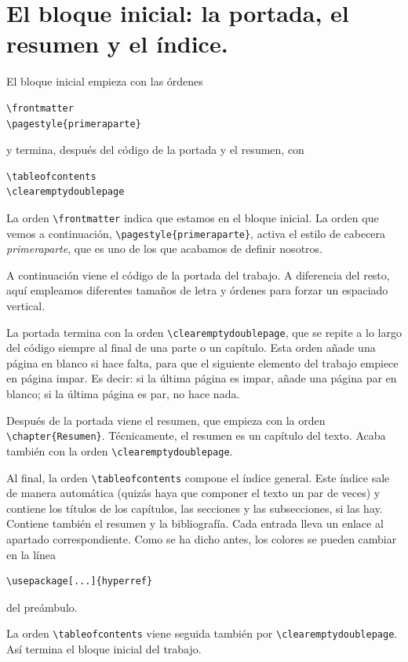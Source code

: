 \documentclass[11pt]{book}
\newcommand{\clearemptydoublepage}{\newpage{\pagestyle{empty}\cleardoublepage}}
\theoremstyle{plain} %
\theoremstyle{definition} %
\begin{document}
\section{El bloque inicial: la portada, el resumen y el índice.}

El bloque inicial empieza con las órdenes
\begin{verbatim}
\frontmatter
\pagestyle{primeraparte}
\end{verbatim}
y termina, después del código de la portada y el resumen, con
\begin{verbatim}
\tableofcontents
\clearemptydoublepage
\end{verbatim}
La orden \verb"\frontmatter" indica que estamos en el bloque inicial. La orden que vemos a continuación, \verb"\pagestyle{primeraparte}", activa el estilo de cabecera \emph{primeraparte}, que es uno de los que acabamos de definir nosotros.

A continuación viene el código de la portada del trabajo. A diferencia del resto, aquí empleamos diferentes tamaños de letra y órdenes para forzar un espaciado vertical.

La portada termina con la orden \verb"\clearemptydoublepage", que se repite a lo largo del código siempre al final de una parte o un capítulo. Esta orden añade una página en blanco si hace falta, para que el siguiente elemento del trabajo empiece en página impar. Es decir: si la última página es impar, añade una página par en blanco; si la última página es par, no hace nada.

Después de la portada viene el resumen, que empieza con la orden \verb"\chapter{Resumen}". Técnicamente, el resumen es un capítulo del texto. Acaba también con la orden \verb"\clearemptydoublepage".

Al final, la orden \verb"\tableofcontents" compone el índice general. Este índice sale de manera automática (quizás haya que componer el texto un par de veces) y 
contiene los títulos de los capítulos, las secciones y las subsecciones, si las 
hay. Contiene también el resumen y la bibliografía. Cada entrada lleva un enlace al apartado 
correspondiente. Como se ha dicho antes, los colores se 
pueden cambiar en la línea
\begin{verbatim}
\usepackage[...]{hyperref}
\end{verbatim}
del preámbulo.

La orden \verb"\tableofcontents" viene seguida también por \verb"\clearemptydoublepage". Así termina el bloque inicial del trabajo.
\end{document}
